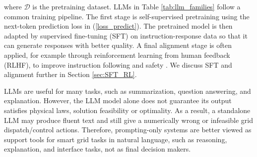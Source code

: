 \documentclass[journal,onecolumn]{IEEEtran} %
\newcommand{\todo}[1]{\color{red}#1\color{black}}
\newcommand{\dani}[1]{\color{blue}#1\color{black}}
\begin{document}
where $\mathcal{D}$ is the pretraining dataset. {LLMs in Table \ref{tab:llm_families} follow a common training pipeline. The first stage is self-supervised pretraining using the next-token prediction loss in (\ref{loss_predict}). The pretrained model is then adapted by supervised fine-tuning (SFT) on instruction-response data so that it can generate responses with better quality.} {A final alignment stage is often applied, for example through reinforcement learning from human feedback (RLHF), to improve instruction following and safety \cite{ouyang2022training}. We discuss SFT and alignment further in Section \ref{sec:SFT_RL}.}

LLMs are useful for many tasks, such as summarization, question answering, and explanation. However, the LLM model alone does not guarantee its output satisfies physical laws, solution feasibility or optimality. As a result, a standalone LLM may produce fluent text and still give a numerically wrong or infeasible grid dispatch/control actions. Therefore, prompting-only systems are better viewed as support tools for smart grid tasks in natural language, such as reasoning, explanation, and interface tasks, not as final decision makers. 

\end{document}
